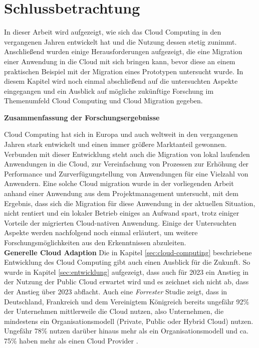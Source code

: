 \chapter{Schlussbetrachtung}
\label{chap:schlussbetrachtung}
In dieser Arbeit wird aufgezeigt, wie sich das Cloud Computing in den vergangenen Jahren entwickelt hat und die Nutzung dessen stetig zunimmt. Anschließend wurden einige Herausforderungen aufgezeigt, die eine Migration einer Anwendung in die Cloud mit sich bringen kann, bevor diese an einem praktischen Beispiel mit der Migration eines Prototypen untersucht wurde. In diesem Kapitel wird noch einmal abschließend auf die untersuchten Aspekte eingegangen und ein Ausblick auf mögliche zukünftige Forschung im Themenumfeld Cloud Computing und Cloud Migration gegeben.

\textbf{Zusammenfassung der Forschungsergebnisse}

Cloud Computing hat sich in Europa und auch weltweit in den vergangenen Jahren stark entwickelt und einen immer größere Marktanteil gewonnen. Verbunden mit dieser Entwicklung steht auch die Migration von lokal laufenden Anwendungen in die Cloud, zur Vereinfachung von Prozessen zur Erhöhung der Performance und Zurverfügungstellung von Anwendungen für eine Vielzahl von Anwendern. Eine solche Cloud migration wurde in der vorliegenden Arbeit anhand einer Anwendung aus dem Projektmanagement untersucht, mit dem Ergebnis, dass sich die Migration für diese Anwendung in der aktuellen Situation, nicht rentiert und ein lokaler Betrieb einiges an Aufwand spart, trotz einiger Vorteile der migrierten Cloud-nativen Anwendung. Einige der Untersuchten Aspekte werden nachfolgend noch einmal erläutert, um weitere Forschungsmöglichkeiten aus den Erkenntnissen abzuleiten. \\

\textbf{Generelle Cloud Adaption}
Die in Kapitel \ref{sec:cloud-computing} beschriebene Entwicklung des Cloud Computing gibt auch einen Ausblick für die Zukunft. So wurde in Kapitel \ref{sec:entwicklung} aufgezeigt, dass auch für 2023 ein Anstieg in der Nutzung der Public Cloud erwartet wird und es zeichnet sich nicht ab, dass der Anstieg über 2023 abflacht. Auch eine \textit{Forrester} Studie zeigt, dass in Deutschland, Frankreich und dem Vereinigtem Königreich bereits ungefähr 92\% der Unternehmen mittlerweile die Cloud nutzen, also Unternehmen, die mindestens ein Organisationsmodell (Private, Public oder Hybrid Cloud) nutzen. Ungefähr 78\% nutzen darüber hinaus mehr als ein Organisationsmodell und ca. 75\% haben mehr als einen Cloud Provider \cite[Vgl.][S. 4]{Rajamani2022}. \pagebreak

